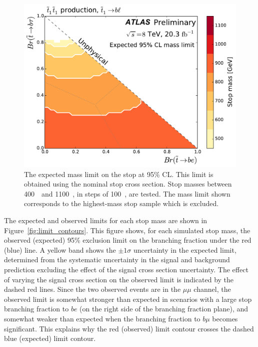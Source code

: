 \begin{figure}[p]
  \centering
  \includegraphics[width=\textwidth]
    {figs/blstop/mass_limit_contours_no_extras_exp.pdf}
  \caption{
    The expected mass limit on the stop at 95\% CL.
    This limit is obtained using the nominal stop cross section.
    Stop masses between 400~\GeV\ and 1100~\GeV, in steps of 100~\GeV, are
    tested.
    The mass limit shown corresponds to the highest-mass stop sample which is
    excluded.
  }
  \label{fig:mass_limit_exp}
\end{figure}

The expected and observed limits for each stop mass are shown in
Figure~\ref{fig:limit_contours}.
This figure shows, for each simulated stop mass, the observed (expected)
95\% exclusion limit on the branching fraction under the red (blue) line.
A yellow band shows the $\pm 1\sigma$ uncertainty in the expected limit,
determined from the systematic uncertainty in the signal and background
prediction excluding the effect of the signal cross section uncertainty.
The effect of varying the signal cross section on the observed limit is
indicated by the dashed red lines.
Since the two observed events are in the $\mu\mu$ channel, the observed limit
is somewhat stronger than expected in scenarios with a large stop branching
fraction to $be$ (on the right side of the branching fraction plane), and somewhat
weaker than expected when the branching fraction to $b\mu$ becomes significant.
This explains why the red (observed) limit contour crosses the dashed
blue (expected) limit contour.

